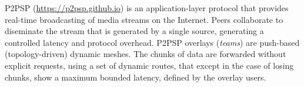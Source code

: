 P2PSP (\url{https://p2psp.github.io}) is an application-layer protocol
that provides real-time broadcasting of media streams on the
Internet. Peers collaborate to diseminate the stream that is generated
by a single source, generating a controlled latency and protocol
overhead. P2PSP overlays (\emph{teams}) are push-based (topology-driven)
dynamic meshes. The chunks of data are forwarded without explicit
requests, using a set of dynamic routes, that except in the case of
losing chunks, show a maximum bounded latency, defined by the overlay
users.
